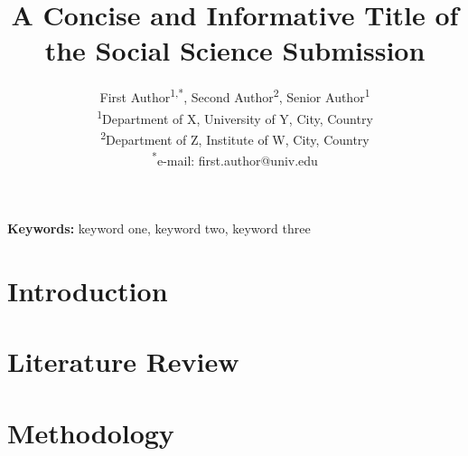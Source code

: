 \documentclass[11pt,a4paper]{article}
\title{A Concise and Informative Title of the Social Science Submission}
\author{First Author\textsuperscript{1,*}, Second Author\textsuperscript{2}, Senior Author\textsuperscript{1}\\
\textsuperscript{1}Department of X, University of Y, City, Country\\
\textsuperscript{2}Department of Z, Institute of W, City, Country\\
\textsuperscript{*}e-mail: first.author@univ.edu}
\date{}
\begin{document}
\maketitle

\begin{abstract}
\end{abstract}

\noindent\textbf{Keywords:} %
keyword one, keyword two, keyword three

\section{Introduction}
\label{sec:intro}

\section{Literature Review}
\label{sec:litreview}

\section{Methodology}
\label{sec:method}
\end{document}
